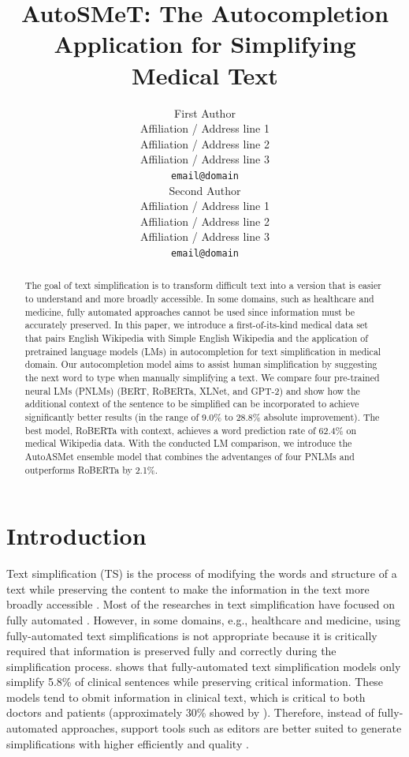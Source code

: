 \documentclass[11pt]{article}
\title{AutoSMeT: The Autocompletion Application for Simplifying Medical Text}
\author{First Author \\
  Affiliation / Address line 1 \\
  Affiliation / Address line 2 \\
  Affiliation / Address line 3 \\
  {\tt email@domain} \\\And
  Second Author \\
  Affiliation / Address line 1 \\
  Affiliation / Address line 2 \\
  Affiliation / Address line 3 \\
  {\tt email@domain} \\}
\date{}
\begin{document}
\maketitle
\begin{abstract} 
  The goal of text simplification is to transform difficult text into a version that is easier to understand and more broadly accessible.  In some domains, such as healthcare and medicine, fully automated approaches cannot be used since information must be accurately preserved. In this paper, we introduce a first-of-its-kind medical data set that pairs English Wikipedia with Simple English Wikipedia and the application of pretrained language models (LMs) in autocompletion for text simplification in medical domain. Our autocompletion model aims to assist human simplification by suggesting the next word to type when manually simplifying a text. We compare four pre-trained neural LMs (PNLMs) (BERT, RoBERTa, XLNet, and GPT-2) and show how the additional context of the sentence to be simplified can be incorporated to achieve significantly better results (in the range of 9.0\% to 28.8\% absolute improvement). The best model, RoBERTa with context, achieves a word prediction rate of 62.4\% on medical Wikipedia data. With the conducted LM comparison, we introduce the AutoASMet ensemble model that combines the adventanges of four PNLMs and outperforms RoBERTa by 2.1\%.

\end{abstract}

\section{Introduction}

Text simplification (TS) is the process of modifying the words and structure of a text while preserving the content to make the information in the text more broadly accessible \cite{shardlow2014survey}. Most of the researches in text simplification have focused on fully automated \cite{zhu10,coster2011learning,xu2016optimizing,zhang2017sentence,nishihara2019controllable}. However, in some domains, e.g., healthcare and medicine, using fully-automated text simplifications is not appropriate because it is critically required that information is preserved fully and correctly during the simplification process. \cite{shardlow2019neural} shows that fully-automated text simplification models only simplify 5.8\% of clinical sentences while preserving critical information. These models tend to obmit information in clinical text, which is critical to both doctors and patients (approximately 30\% showed by \cite{shardlow2019neural}). Therefore, instead of fully-automated approaches, support tools such as editors are better suited to generate simplifications with higher efficiently and quality \cite{kloehn2018jmir}.
\end{document}
